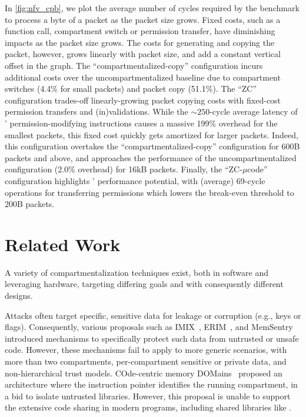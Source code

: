 In \autoref{fig:nfv_cpb}, we plot the average number of cycles
required by the benchmark to process a byte of a packet
as the packet size grows.
Fixed costs, such as a function call, compartment switch or 
permission transfer, have diminishing impacts as the packet size grows.
The costs for generating and copying the packet, however, grows
linearly with packet size, and add a constant vertical offset in the
graph.
The ``compartmentalized-copy'' configuration incurs additional costs over the
uncompartmentalized baseline due to 
compartment switches (4.4\% for small packets) and packet copy (51.1\%).
The ``\seccells ZC'' configuration trades-off linearly-growing 
packet copying costs with fixed-cost permission transfers and
(in)validations.
While the $\sim250$-cycle average latency of \seccells' 
permission-modifying instructions causes a massive 199\% overhead
for the smallest packets, this fixed cost quickly gets amortized
for larger packets.
Indeed, this configuration overtakes the ``compartmentalized-copy'' configuration
for 600B packets and above, and approaches the performance
of the uncompartmentalized configuration (2.0\% overhead) for
16kB packets.
Finally, the ``\seccells ZC-$\mu$code'' configuration highlights \seccells'
performance potential, with (average) 69-cycle operations for 
transferring permissions which lowers the break-even threshold to
200B packets.

\section{Related Work}
\label{sec:related}

A variety of compartmentalization techniques exist, both in software and
leveraging hardware, targeting differing goals and with consequently
different designs.

Attacks often target specific, sensitive data for 
leakage or corruption (e.g., keys or flags).
Consequently, various proposals such as IMIX~\cite{FrassettoJLS18},
ERIM~\cite{ERIMOberwagner19}, and MemSentry~\cite{KoningCBGA17} introduced 
mechanisms to specifically protect 
such data from untrusted or unsafe code.
However, these mechanisms fail to apply to more generic scenarios,
with more than two compartments, per-compartment sensitive or private
data, and non-hierarchical trust models.
COde-centric memory DOMains~\cite{VilanovaBNEV14} proposed an architecture
where the instruction pointer identifies the running compartment, in a bid
to isolate untrusted libraries.
However, this proposal is unable to support the extensive code sharing 
in modern programs, including shared libraries like .

